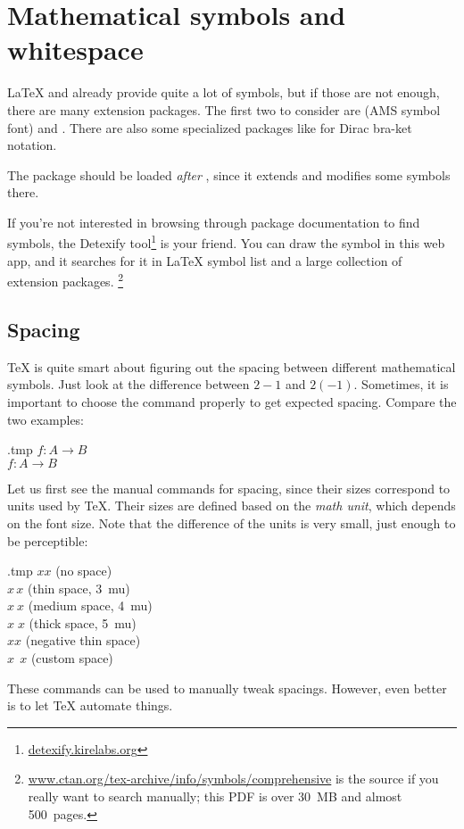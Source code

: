 %
%
%
\section{Mathematical symbols and whitespace}

\LaTeX{} and  already provide quite a lot of symbols,
but if those are not enough, there are many extension packages.
The first two to consider are  (AMS symbol font)
and .
There are also some specialized packages like  for Dirac bra-ket notation.

\begin{gotcha}
The  package should be loaded \emph{after} ,
since it extends and modifies some symbols there.
\end{gotcha}

If you're not interested in browsing through package documentation to find symbols,
the Detexify tool\footnote{\url{detexify.kirelabs.org}} is your friend.
You can draw the symbol in this web app,
and it searches for it in \LaTeX{} symbol list and a large collection of extension packages.%
\footnote{\url{www.ctan.org/tex-archive/info/symbols/comprehensive}
is the source if you really want to search manually;
this PDF is over 30~MB and almost 500~pages.}


%
%
\subsection{Spacing}\label{sec:math spacing}

\TeX{} is quite smart about figuring out the spacing between different mathematical symbols.
Just look at the difference between $2 - 1$ and $2 (-1)$.
Sometimes, it is important to choose the command properly to get expected spacing.
Compare the two examples:
%
\begin{VerbatimOut}{\jobname.tmp}
$f : A \to B$\\
$f \colon A \to B$
\end{VerbatimOut}
\ShowExample

Let us first see the manual commands for spacing,
since their sizes correspond to units used by \TeX.
Their sizes are defined based on the \emph{math unit}, which depends on the font size.
Note that the difference of the units is very small,
just enough to be perceptible:
%
\begin{VerbatimOut}{\jobname.tmp}
$xx$ (no space)\\
$x\,x$ (thin space, 3~mu)\\
$x\:x$ (medium space, 4~mu)\\
$x\;x$ (thick space, 5~mu)\\
$x\!x$ (negative thin space)\\
$x\mspace{8mu}x$ (custom space)
\end{VerbatimOut}
\ShowExample
%
These commands can be used to manually tweak spacings.
However, even better is to let \TeX{} automate things.


